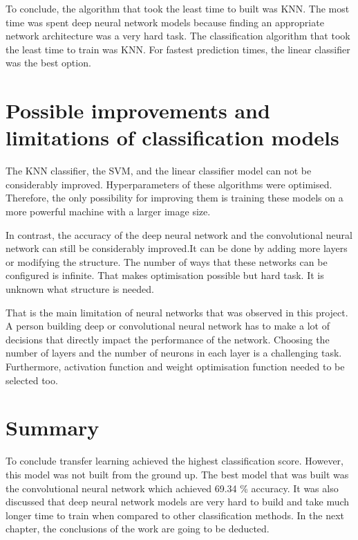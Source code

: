 To conclude, the algorithm that took the least time to built was KNN. The most time was spent deep neural network models because finding an appropriate network architecture was a very hard task. The classification algorithm that took the least time to train was KNN. For fastest prediction times, the linear classifier was the best option.

\section{Possible improvements and limitations of classification models}

The KNN classifier, the SVM,  and the linear classifier model can not be considerably improved.  Hyperparameters of these algorithms were optimised. Therefore, the only possibility for improving them is training these models on a more powerful machine with a larger image size.

In contrast,  the accuracy of the deep neural network and the convolutional neural network can still be considerably improved.It can be done by adding more layers or modifying the structure. The number of ways that these networks can be configured is infinite. 
That makes optimisation possible but hard task. It is unknown what structure is needed.

That is the main limitation of neural networks that was observed in this project. A person building deep or convolutional neural network has to make a lot of decisions that directly impact the performance of the network. Choosing the number of layers and the number of neurons in each layer is a challenging task. Furthermore, activation function and weight optimisation function needed to be selected too.

\section{Summary}

To conclude transfer learning achieved the highest classification score. However, this model was not built from the ground up. The best model that was built was the convolutional neural network which achieved 69.34 \% accuracy.  It was also discussed that deep neural network models are very hard to build and take much longer time to train when compared to other classification methods. In the next chapter, the conclusions of the work are going to be deducted.

